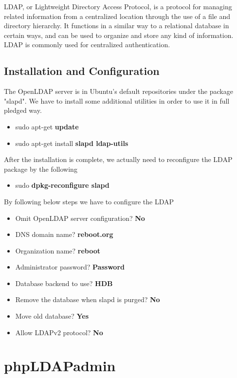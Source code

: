 \documentclass[12pt]{report}
\begin{document}
	LDAP, or Lightweight Directory Access Protocol, is a protocol for managing related information from a centralized location through the use of a file and directory hierarchy. It functions in a similar way to a relational database in certain ways, and can be used to organize and store any kind of information. LDAP is commonly used for centralized authentication.

\subsection{Installation and Configuration}
	The OpenLDAP server is in Ubuntu's default repositories under the package "slapd". We have to install some additional utilities in order to use it in full pledged way.
	
	\begin{itemize}
	\item sudo apt-get \textbf{update}
	\item sudo apt-get install \textbf{slapd ldap-utils}
	\end{itemize}

	After the installation is complete, we actually need to reconfigure the LDAP package by the following
	\begin{itemize}
	\item sudo \textbf{dpkg-reconfigure slapd}
	\end{itemize}

		By following below steps we have to configure the LDAP
	\begin{itemize}
		\item Omit OpenLDAP server configuration? \textbf{No}
		\item DNS domain name? \textbf{reboot.org}
		\item Organization name? \textbf{reboot}
		\item Administrator password? \textbf{Password}
		\item Database backend to use? \textbf{HDB}
		\item Remove the database when slapd is purged? \textbf{No}
		\item Move old database? \textbf{Yes}
		\item Allow LDAPv2 protocol? \textbf{No}
	\end{itemize}
	
\pagebreak
	
\section{phpLDAPadmin}	
	
\end{document}
